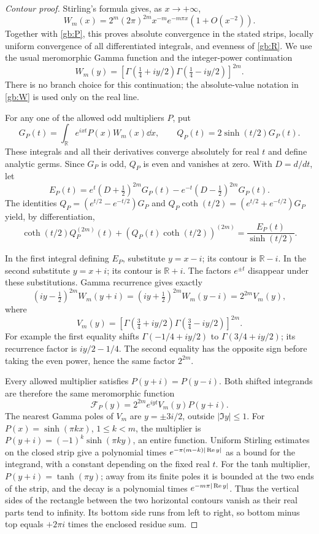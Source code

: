 \begin{proof}[Contour proof]
Stirling's formula gives, as $x\to+\infty$,
\[
 W_m(x)=2^m(2\pi)^{2m}x^{-m}e^{-m\pi x}(1+O(x^{-2})).
\]
Together with \eqref{gb:P}, this proves absolute convergence in
the stated strips, locally uniform convergence of all differentiated
integrals, and evenness of \eqref{gb:R}.  We use the usual meromorphic
Gamma function and the integer-power continuation
\[
 W_m(y)=\left[
 \Gamma(\tfrac14+iy/2)\Gamma(\tfrac14-iy/2)\right]^{2m}.
\]
There is no branch choice for this continuation; the absolute-value
notation in \eqref{gb:W} is used only on the real line.

For any one of the allowed odd multipliers $P$, put
\[
 G_P(t)=\int_{\mathbb R}e^{ixt}P(x)W_m(x)\dd x,
 \qquad Q_P(t)=2\sinh(t/2)G_P(t).
\]
These integrals and all their derivatives converge absolutely for
real $t$ and define analytic germs.  Since $G_P$ is odd, $Q_P$ is
even and vanishes at zero.  With $D=d/dt$, let
\[
 E_P(t)=e^t(D+\tfrac12)^{2m}G_P(t)
                 -e^{-t}(D-\tfrac12)^{2m}G_P(t).
\]
The identities $Q_P=(e^{t/2}-e^{-t/2})G_P$ and
$Q_P\coth(t/2)=(e^{t/2}+e^{-t/2})G_P$ yield, by differentiation,
\begin{equation}\label{gb:contour-algebra}
 \coth(t/2)Q_P^{(2m)}(t)
       +(Q_P(t)\coth(t/2))^{(2m)}
                    =\frac{E_P(t)}{\sinh(t/2)}.
\end{equation}

In the first integral defining $E_P$, substitute $y=x-i$;
its contour is $\mathbb R-i$.  In the second substitute $y=x+i$;
its contour is $\mathbb R+i$.  The factors $e^{\pm t}$ disappear
under these substitutions.  Gamma recurrence gives exactly
\begin{equation}\label{gb:gamma-cancellation}
 (iy-\tfrac12)^{2m}W_m(y+i)
 =(iy+\tfrac12)^{2m}W_m(y-i)=2^{2m}V_m(y),
\end{equation}
where
\[
 V_m(y)=\left[
 \Gamma(\tfrac34+iy/2)\Gamma(\tfrac34-iy/2)\right]^{2m}.
\]
For example the first equality shifts
$\Gamma(-1/4+iy/2)$ to $\Gamma(3/4+iy/2)$; its recurrence
factor is $iy/2-1/4$.  The second equality has the opposite sign
before taking the even power, hence the same factor $2^{2m}$.

Every allowed multiplier satisfies $P(y+i)=P(y-i)$.  Both shifted
integrands are therefore the same meromorphic function
\[
 \mathcal F_P(y)=2^{2m}e^{iyt}V_m(y)P(y+i).
\]
The nearest Gamma poles of $V_m$ are $y=\pm3i/2$, outside
$|\Im y|\le1$.  For $P(x)=\sinh(\pi kx)$, $1\le k<m$,
the multiplier is $P(y+i)=(-1)^k\sinh(\pi ky)$, an entire
function.  Uniform Stirling estimates on the closed strip give
a polynomial times $e^{-\pi(m-k)|\operatorname{Re} y|}$ as a bound for the
integrand, with a constant depending on the fixed real $t$.
For the tanh multiplier, $P(y+i)=\tanh(\pi y)$; away from its
finite poles it is bounded at the two ends of the strip, and
the decay is a polynomial times $e^{-m\pi|\operatorname{Re} y|}$.
Thus the vertical sides of the rectangle between the two horizontal
contours vanish as their real parts tend to infinity.  Its bottom
side runs from left to right, so bottom minus top equals
$+2\pi i$ times the enclosed residue sum.


\end{proof}
